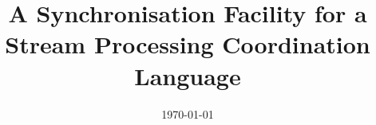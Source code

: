 \documentclass[a4paper, 11pt, oneside]{Thesis}  %
\begin{document}
\frontmatter      %

\title  {A Synchronisation Facility for a Stream Processing Coordination Language}
\addresses  {\groupname\\\deptname\\\univname}  %
\date       {\today}
\subject    {}
\keywords   {}

\maketitle


\fancyhead{}  %
\rhead{\thepage}  %
\lhead{}  %

\pagestyle{fancy}  %




\end{document}
